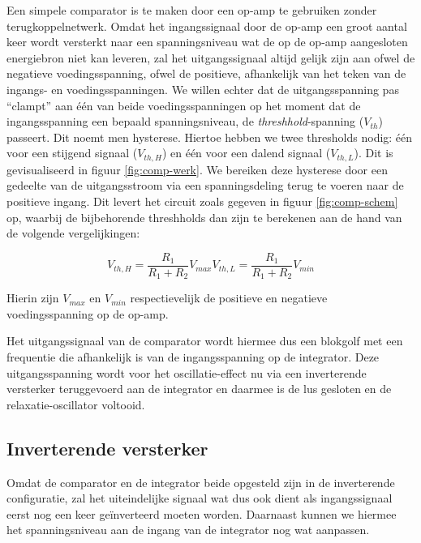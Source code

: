 \documentclass{report}
\begin{document}
Een simpele comparator is te maken door een op-amp te gebruiken zonder terugkoppelnetwerk. Omdat het ingangssignaal door de op-amp een groot aantal keer wordt versterkt naar een spanningsniveau wat de op de op-amp aangesloten energiebron niet kan leveren, zal het uitgangssignaal altijd gelijk zijn aan ofwel de negatieve voedingsspanning, ofwel de positieve, afhankelijk van het teken van de ingangs- en voedingsspanningen. We willen echter dat de uitgangsspanning pas ``clampt'' aan één van beide voedingsspanningen op het moment dat de ingangsspanning een bepaald spanningsniveau, de \textit{threshhold}-spanning ($V_{th}$) passeert. Dit noemt men hysterese. Hiertoe hebben we twee thresholds nodig: één voor een stijgend signaal ($V_{th,H}$) en één voor een dalend signaal ($V_{th,L}$). Dit is gevisualiseerd in figuur \ref{fig:comp-werk}. We bereiken deze hysterese door een gedeelte van de uitgangsstroom via een spanningsdeling terug te voeren naar de positieve ingang. Dit levert het circuit zoals gegeven in figuur \ref{fig:comp-schem} op, waarbij de bijbehorende threshholds dan zijn te berekenen aan de hand van de volgende vergelijkingen:

\begin{subequations}
	\begin{equation}
		V_{th,H} = \frac{R_{1}}{R_{1}+R_{2}}V_{max}
		\label{eq:comp-H}
	\end{equation}

	\begin{equation}
		V_{th,L} = \frac{R_{1}}{R_{1}+R_{2}}V_{min}
		\label{eq:comp-L}
	\end{equation}
	\label{eq:comp}
\end{subequations}

\noindent
Hierin zijn $V_{max}$ en $V_{min}$ respectievelijk de positieve en negatieve voedingsspanning op de op-amp.

Het uitgangssignaal van de comparator wordt hiermee dus een blokgolf met een frequentie die afhankelijk is van de ingangsspanning op de integrator. Deze uitgangsspanning wordt voor het oscillatie-effect nu via een inverterende versterker teruggevoerd aan de integrator en daarmee is de lus gesloten en de relaxatie-oscillator voltooid.

\subsection{Inverterende versterker}
Omdat de comparator en de integrator beide opgesteld zijn in de inverterende configuratie, zal het uiteindelijke signaal wat dus ook dient als ingangssignaal eerst nog een keer geïnverteerd moeten worden. Daarnaast kunnen we hiermee het spanningsniveau aan de ingang van de integrator nog wat aanpassen. 
\end{document}
